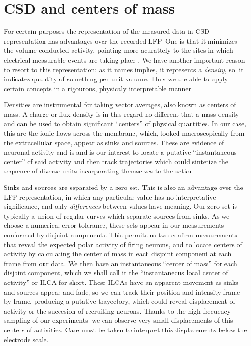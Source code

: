 \documentclass{article}
\begin{document}
\section{CSD and centers of mass}


For certain purposes the representation of the measured data in CSD
representation has advantages over the recorded LFP. One is
that it minimizes the volume-conducted activity, pointing more acurattely
to the sites in which electrical-measurable events are taking place \cite{Mitzdorf85}.
We have another important reason to resort to this representation:
as it names implies, it represents a \emph{density}, so, it indicates
quantity of something per unit volume. Thus we are able to apply certain
concepts in a rigourous, physicaly interpretable manner.

Densities are instrumental for taking vector averages, also known as centers
of mass. A charge or flux density is in this regard no different that a
mass density and can be used to obtain significant ``centers'' of
physical quantities. In our case, this are the ionic flows across
the membrane, which, looked macroscopically from the extracellular
space, appear as sinks and sources. These are evidence of neuronal
activity and is and is our interest to locate a
putative ``instantaneous center'' of said activity and then track
trajectories which could sintetize the sequence of diverse units
incorporating themselves to the action.

Sinks and sources are separated by a zero set. This is also an advantage
over the LFP representation, in which any particular value has no
interpretative significance, and only \emph{differences} between values
have meaning. 
Our zero  set is typically a union of regular 
curves which separate sources from sinks. As we choose a numerical error
tolerance, these sets appear in our measurements conformed by disjoint
components. This permits us two confirm measurements that reveal
the expected polar activity of firing neurons, and to locate centers
of  activity by calculating the center of mass in each disjoint component
at each frame from our data. We then have an instantaneous ``center of mass''
for each disjoint component, which we shall call it the ``instantaneous local
center of activity'' or ILCA for short. These ILCAs have an apparent
movement as sinks and sources appear and fade, so we can track their
position and intensity frame by frame, producing a putative trayectory,
which could reveal displacement of activity or the succesion of recruiting
neurons. 
Thanks to the high frecuency sampling of our experiments, we can observe
very small displacements of this centers of activities. Care must be taken
to interpret this displacements below the electrode scale.
\end{document}
